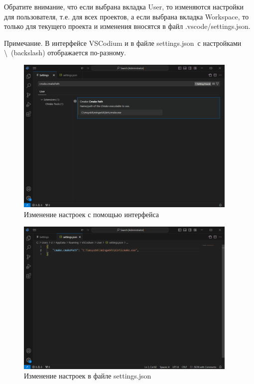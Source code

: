 \documentclass[a4paper,12pt]{article}
\begin{document}
Обратите внимание, что если выбрана вкладка User, то изменяются настройки для пользователя, т.е. для всех проектов, а если выбрана вкладка Workspace, то только для текущего проекта и изменения вносятся в файл \textquotedbl .vscode/settings.json\textquotedbl.

Примечание.
В интерфейсе VSCodium и в файле \textquotedbl settings.json\textquotedbl \ с настройками \textbackslash ~(backslash) отображается по-разному.

\begin{figure}[H]
	\centering
	\includegraphics[width=0.95\textwidth]{images/Settings_of_interface.png}
	\caption {Изменение настроек с помощью интерфейса}
	\label{fig:Settings_of_interface}
\end{figure}

\begin{figure}[H]
	\centering
	\includegraphics[width=0.95\textwidth]{images/Settings_of_json_file.png}
	\caption {Изменение настроек в файле \textquotedbl settings.json\textquotedbl}
	\label{fig:Settings_of_json_file}
\end{figure}
\end{document}
